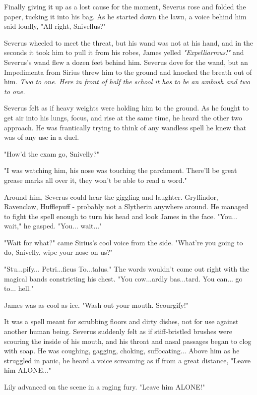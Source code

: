\documentclass[a4paper,11pt]{article}
\begin{document}
Finally giving it up as a lost cause for the moment, Severus rose and folded the paper, tucking it into his bag. As he started down the lawn, a voice behind him said loudly, "All right, Snivellus?"

Severus wheeled to meet the threat, but his wand was not at his hand, and in the seconds it took him to pull it from his robes, James yelled \emph{"Expelliarmus!"} and Severus's wand flew a dozen feet behind him. Severus dove for the wand, but an Impedimenta from Sirius threw him to the ground and knocked the breath out of him. \emph{Two to one. Here in front of half the school it has to be an ambush and two to one.}

Severus felt as if heavy weights were holding him to the ground. As he fought to get air into his lungs, focus, and rise at the same time, he heard the other two approach. He was frantically trying to think of any wandless spell he knew that was of any use in a duel.

"How'd the exam go, Snivelly?"

"I was watching him, his nose was touching the parchment. There'll be great grease marks all over it, they won't be able to read a word."

Around him, Severus could hear the giggling and laughter. Gryffindor, Ravenclaw, Hufflepuff - probably not a Slytherin anywhere around. He managed to fight the spell enough to turn his head and look James in the face. "You... wait," he gasped. "You... wait..."

"Wait for what?" came Sirius's cool voice from the side. "What're you going to do, Snivelly, wipe your nose on us?"

"Stu...pify... Petri...ficus To...talus." The words wouldn't come out right with the magical bands constricting his chest. "You cow...ardly bas...tard. You can... go to... hell."

James was as cool as ice. "Wash out your mouth. Scourgify!"

It was a spell meant for scrubbing floors and dirty dishes, not for use against another human being. Severus suddenly felt as if stiff-bristled brushes were scouring the inside of his mouth, and his throat and nasal passages began to clog with soap. He was coughing, gagging, choking, suffocating... Above him as he struggled in panic, he heard a voice screaming as if from a great distance, "Leave him ALONE..."

Lily advanced on the scene in a raging fury. "Leave him ALONE!"
\end{document}
